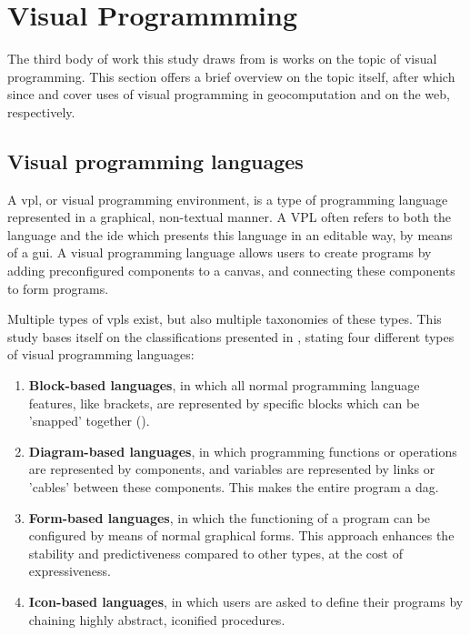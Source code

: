 \section{Visual Programmming}
\label{sec:background-vpl}

The third body of work this study draws from is works on the topic of visual programming. 
This section offers a brief overview on the topic itself, after which since  and  cover uses of visual programming in geocomputation and on the web, respectively. 

\subsection*{Visual programming languages}

A \ac{vpl}, or visual programming environment, is a type of programming language represented in a graphical, non-textual manner.
A VPL often refers to both the language and the \ac{ide} which presents this language in an editable way, by means of a \ac{gui}.
A visual programming language allows users to create programs by adding preconfigured components to a canvas, and connecting these components to form programs. 

Multiple types of \ac{vpl}s exist, but also multiple taxonomies of these types.
This study bases itself on the classifications presented in \cite{kuhail_characterizing_2021}, stating four different types of visual programming languages: 
\begin{enumerate}
  \item \textbf{Block-based languages}, in which all normal programming language features, like brackets, are represented by specific blocks which can be 'snapped' together (\label{fig:sidebyside:1}).
  \item \textbf{Diagram-based languages}, in which programming functions or operations are represented by components, and variables are represented by links or 'cables' between these components. This makes the entire program a \ac{dag}.
  \item \textbf{Form-based languages}, in which the functioning of a program can be configured by means of normal graphical forms. 
  This approach enhances the stability and predictiveness compared to other types, at the cost of expressiveness.
  \item \textbf{Icon-based languages}, in which users are asked to define their programs by chaining highly abstract, iconified procedures. 
\end{enumerate}

